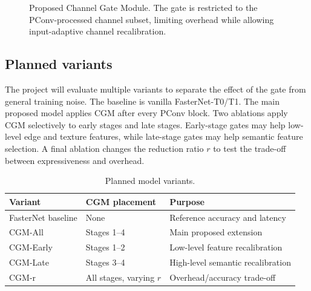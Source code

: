 \documentclass{article}
\begin{document}
\begin{figure}[t]
\centering
{}
\caption{Proposed Channel Gate Module. The gate is restricted to the PConv-processed channel subset, limiting overhead while allowing input-adaptive channel recalibration.}
\label{fig:cgm}
\end{figure}

\subsection{Planned variants}

The project will evaluate multiple variants to separate the effect of the gate from general training noise. The baseline is vanilla FasterNet-T0/T1. The main proposed model applies CGM after every PConv block. Two ablations apply CGM selectively to early stages and late stages. Early-stage gates may help low-level edge and texture features, while late-stage gates may help semantic feature selection. A final ablation changes the reduction ratio $r$ to test the trade-off between expressiveness and overhead.

\begin{table}[t]
\caption{Planned model variants.}
\label{tab:variants}
\centering
\begin{tabular}{lll}
\toprule
Variant & CGM placement & Purpose \\
\midrule
FasterNet baseline & None & Reference accuracy and latency \\
CGM-All & Stages 1--4 & Main proposed extension \\
CGM-Early & Stages 1--2 & Low-level feature recalibration \\
CGM-Late & Stages 3--4 & High-level semantic recalibration \\
CGM-r & All stages, varying $r$ & Overhead/accuracy trade-off \\
\bottomrule
\end{tabular}
\end{table}
\end{document}
